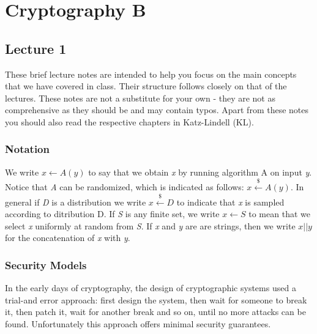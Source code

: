 \documentclass[oneside,a4paper,12pt]{book}
\begin{document}
\part{Cryptography B}

\chapter{Lecture 1}%

These brief lecture notes are intended to help you focus on the main concepts that we have covered in class. Their structure follows closely on that of the lectures. These notes are not a substitute for your own - they are not as comprehensive as they should be and may contain typos. Apart from these notes you should also read the respective chapters in Katz-Lindell (KL).

\section{Notation}

We write \begin{math}x \gets A(y)\end{math} to say that we obtain \textit{x} by running algorithm A on input \textit{y}. Notice that \textit{A} can be randomized, which is indicated as follows: \begin{math}x\xleftarrow{\$}A(y)\end{math}. In general if \textit{D} is a distribution we write \begin{math}x\xleftarrow{\$}D\end{math} to indicate that \textit{x} is sampled according to ditribution D. If \textit{S} is any finite set, we write \begin{math}x\gets S\end{math} to mean that we select \textit{x} uniformly at random from \textit{S}. If \textit{x} and \textit{y} are are strings, then we write \begin{math}x||y\end{math} for the concatenation of \textit{x} with \textit{y}.

\section{Security Models}


In the early days of cryptography, the design of cryptographic systems used a trial-and error approach: first design the system, then wait for someone to break it, then patch it, wait for another break and so on, until no more attacks can be found. Unfortunately this approach offers minimal security guarantees.
\end{document}
